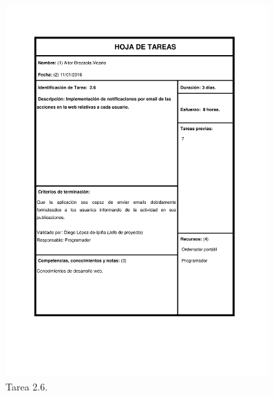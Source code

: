 \documentclass{DeustoFDP}
\begin{document}
\begin{figure}[H]
    \centering
    \includegraphics[width=0.9\textwidth]{fig/Tareas/26}
    \caption{Tarea 2.6.}
    \label{fig:t26}
\end{figure}
\end{document}
